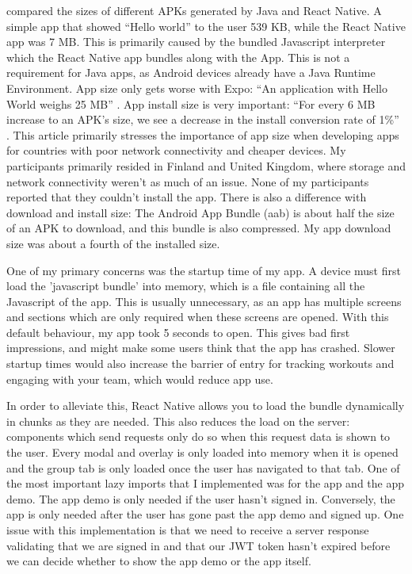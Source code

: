 \documentclass{l4proj}
\begin{document}
\citet{app_size} compared the sizes of different APKs generated by Java and React Native. A simple app that showed ``Hello world'' to the user 539 KB, while the React Native app was 7 MB. This is primarily caused by the bundled Javascript interpreter which the React Native app bundles along with the App. This is not a requirement for Java apps, as Android devices already have a Java Runtime Environment. App size only gets worse with Expo: ``An application with Hello World weighs 25 MB'' \citep{expo}. App install size is very important: ``For every 6 MB increase to an APK’s size, we see a decrease in the install conversion rate of 1\%'' \citep{app_conversions}. This article primarily stresses the importance of app size when developing apps for countries with poor network connectivity and cheaper devices. My participants primarily resided in Finland and United Kingdom, where storage and network connectivity weren't as much of an issue. None of my participants reported that they couldn't install the app. There is also a difference with download and install size: The Android App Bundle (aab) is about half the size of an APK to download, and this bundle is also compressed. My app download size was about a fourth of the installed size.

One of my primary concerns was the startup time of my app. A device must first load the 'javascript bundle' into memory, which is a file containing all the Javascript of the app. This is usually unnecessary, as an app has multiple screens and sections which are only required when these screens are opened. With this default behaviour, my app took 5 seconds to open. This gives bad first impressions, and might make some users think that the app has crashed. Slower startup times would also increase the barrier of entry for tracking workouts and engaging with your team, which would reduce app use.

In order to alleviate this, React Native allows you to load the bundle dynamically in chunks as they are needed. This also reduces the load on the server: components which send requests only do so when this request data is shown to the user. Every modal and overlay is only loaded into memory when it is opened and the group tab is only loaded once the user has navigated to that tab. One of the most important lazy imports that I implemented was for the app and the app demo. The app demo is only needed if the user hasn't signed in. Conversely, the app is only needed after the user has gone past the app demo and signed up. One issue with this implementation is that we need to receive a server response validating that we are signed in and that our JWT token hasn't expired before we can decide whether to show the app demo or the app itself.
\end{document}
